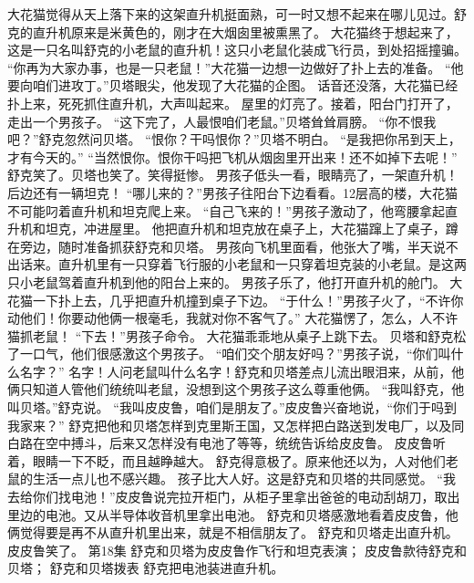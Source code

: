 \documentclass[a4paper,12pt,UTF8,twoside]{ctexbook}
\begin{document}
        大花猫觉得从天上落下来的这架直升机挺面熟，可一时又想不起来在哪儿见过。舒克的直升机原来是米黄色的，刚才在大烟囱里被熏黑了。 
        大花猫终于想起来了，这是一只名叫舒克的小老鼠的直升机！这只小老鼠化装成飞行员，到处招摇撞骗。 
        “你再为大家办事，也是一只老鼠！”大花猫一边想一边做好了扑上去的准备。 
        “他要向咱们进攻丁。”贝塔眼尖，他发现了大花猫的企图。 
        话音还没落，大花猫已经扑上来，死死抓住直升机，大声叫起来。 
        屋里的灯亮了。接着，阳台门打开了，走出一个男孩子。 
        “这下完了，人最恨咱们老鼠。”贝塔耸耸肩膀。 
        “你不恨我吧？”舒克忽然问贝塔。 
        “恨你？干吗恨你？”贝塔不明白。 
        “是我把你吊到天上，才有今天的。” 
        “当然恨你。恨你干吗把飞机从烟囱里开出来！还不如掉下去呢！” 
        舒克笑了。贝塔也笑了。笑得挺惨。 
        男孩子低头一看，眼睛亮了，一架直升机！后边还有一辆坦克！ 
        “哪儿来的？”男孩子往阳台下边看看。12层高的楼，大花猫不可能叼着直升机和坦克爬上来。 
        “自己飞来的！”男孩子激动了，他弯腰拿起直升机和坦克，冲进屋里。 
        他把直升机和坦克放在桌子上，大花猫蹿上了桌子，蹲在旁边，随时准备抓获舒克和贝塔。 
        男孩向飞机里面看，他张大了嘴，半天说不出话来。直升机里有一只穿着飞行服的小老鼠和一只穿着坦克装的小老鼠。是这两只小老鼠驾着直升机到他的阳台上来的。 
        男孩子乐了，他打开直升机的舱门。 
        大花猫一下扑上去，几乎把直升机撞到桌子下边。 
        “于什么！”男孩子火了，“不许你动他们！你要动他俩一根毫毛，我就对你不客气了。” 
        大花猫愣了，怎么，人不许猫抓老鼠！ 
        “下去！”男孩子命令。 
        大花猫乖乖地从桌子上跳下去。 
        贝塔和舒克松了一口气，他们很感激这个男孩子。 
        “咱们交个朋友好吗？”男孩子说，“你们叫什么名字？” 
        名字！人问老鼠叫什么名字！舒克和贝塔差点儿流出眼泪来，从前，他俩只知道人管他们统统叫老鼠，没想到这个男孩子这么尊重他俩。 
        “我叫舒克，他叫贝塔。”舒克说。 
        “我叫皮皮鲁，咱们是朋友了。”皮皮鲁兴奋地说，“你们于吗到我家来？” 
        舒克把他和贝塔怎样到克里斯王国，又怎样把白路送到发电厂，以及同白路在空中搏斗，后来又怎样没有电池了等等，统统告诉给皮皮鲁。 
        皮皮鲁听着，眼睛一下不眨，而且越睁越大。 
        舒克得意极了。原来他还以为，人对他们老鼠的生活一点儿也不感兴趣。 
        孩子比大人好。这是舒克和贝塔的共同感觉。 
        “我去给你们找电池！”皮皮鲁说完拉开柜门，从柜子里拿出爸爸的电动刮胡刀，取出里边的电池。又从半导体收音机里拿出电池。 
        舒克和贝塔感激地看着皮皮鲁，他俩觉得要是再不从直升机里出来，就是不相信朋友了。 
        舒克和贝塔走出直升机。皮皮鲁笑了。   第18集   
        舒克和贝塔为皮皮鲁作飞行和坦克表演； 
        皮皮鲁款待舒克和贝塔； 
        舒克和贝塔拨表   
        舒克把电池装进直升机。 
\end{document}

